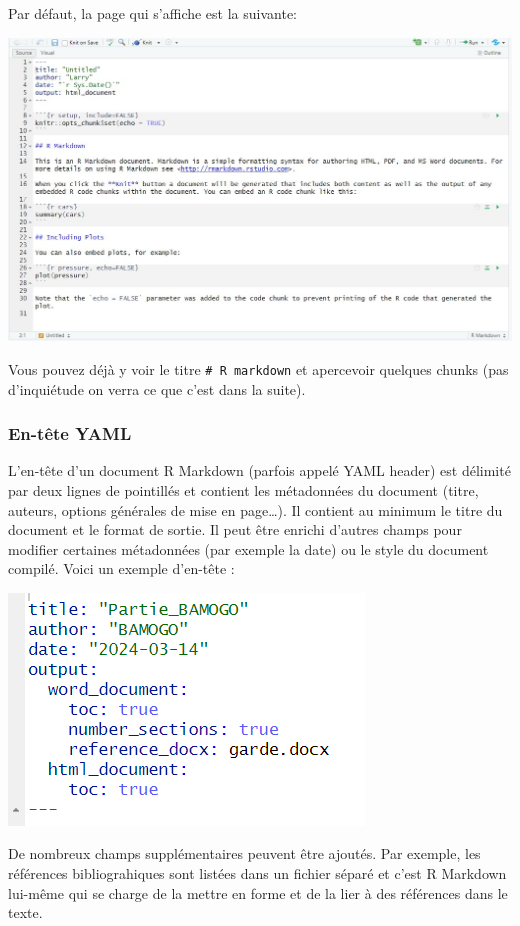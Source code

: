 \documentclass[
  12pt,
]{article}
\begin{document}
Par défaut, la page qui s'affiche est la suivante:

\begin{center}\includegraphics[width=0.6\linewidth,height=0.6\textheight]{../Document_Rmarkdown/Images/Page_defaut} \end{center}

Vous pouvez déjà y voir le titre \texttt{\#\ R\ markdown} et apercevoir
quelques chunks (pas d'inquiétude on verra ce que c'est dans la suite).

\subsubsection{En-tête YAML}\label{en-tuxeate-yaml}

L'en-tête d'un document R Markdown (parfois appelé YAML header) est
délimité par deux lignes de pointillés et contient les métadonnées du
document (titre, auteurs, options générales de mise en page\ldots). Il
contient au minimum le titre du document et le format de sortie. Il peut
être enrichi d'autres champs pour modifier certaines métadonnées (par
exemple la date) ou le style du document compilé. Voici un exemple
d'en-tête :

\begin{center}\includegraphics[width=0.5\linewidth,height=0.5\textheight]{../Document_Rmarkdown/Images/Entete} \end{center}

De nombreux champs supplémentaires peuvent être ajoutés. Par exemple,
les références bibliograhiques sont listées dans un fichier séparé et
c'est R Markdown lui-même qui se charge de la mettre en forme et de la
lier à des références dans le texte.
\end{document}
